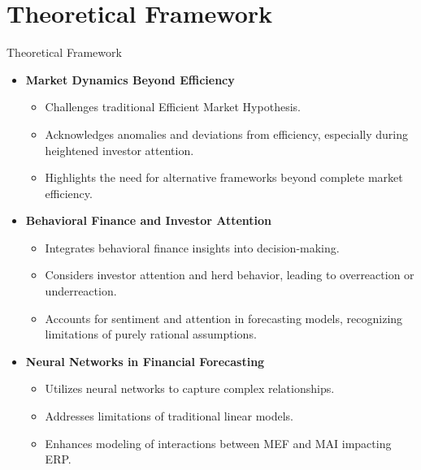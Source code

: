 \documentclass{beamer}
\begin{document}
\section{Theoretical Framework}
\begin{frame}{Theoretical Framework}
  \begin{itemize}
    \item \textbf{Market Dynamics Beyond Efficiency}
      \begin{itemize}
        \item Challenges traditional Efficient Market Hypothesis.
        \item Acknowledges anomalies and deviations from efficiency, especially during heightened investor attention.
        \item Highlights the need for alternative frameworks beyond complete market efficiency.
      \end{itemize}
    \item \textbf{Behavioral Finance and Investor Attention}
      \begin{itemize}
        \item Integrates behavioral finance insights into decision-making.
        \item Considers investor attention and herd behavior, leading to overreaction or underreaction.
        \item Accounts for sentiment and attention in forecasting models, recognizing limitations of purely rational assumptions.
      \end{itemize}
    \item \textbf{Neural Networks in Financial Forecasting}
      \begin{itemize}
        \item Utilizes neural networks to capture complex relationships.
        \item Addresses limitations of traditional linear models.
        \item Enhances modeling of interactions between MEF and MAI impacting ERP.
      \end{itemize}  
  \end{itemize}
\end{frame}
\end{document}
